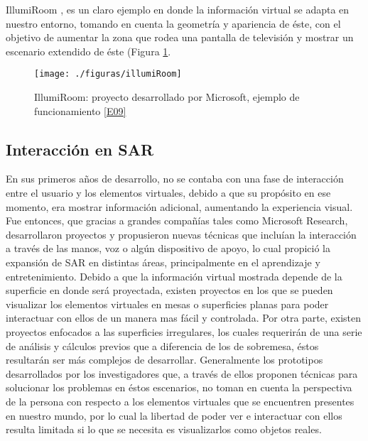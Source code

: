 \documentclass[a4paper,openright,12pt]{report}
\begin{document}
IllumiRoom \cite{jones2013}, es un claro ejemplo en donde la información virtual se adapta en nuestro entorno, tomando en cuenta la geometría y apariencia de éste, con el objetivo de aumentar la zona que rodea una pantalla de televisión y mostrar un escenario extendido de éste (Figura \ref{fig:illumiRoom}.
\begin{figure}[thb]
	\centering
	\texttt{[image: ./figuras/illumiRoom]}
	\caption[Proyecto IllumiRoom por Microsoft\textregistered]{IllumiRoom: proyecto desarrollado por Microsoft\textregistered, ejemplo de funcionamiento \hyperlink{e09}{[E09]} } \label{fig:illumiRoom}
\end{figure}
\subsection{Interacción en SAR}
En sus primeros años de desarrollo, no se contaba con una fase de interacción entre el usuario y los elementos virtuales, debido a que su propósito en ese momento, era mostrar información adicional, aumentando la experiencia visual. Fue entonces, que gracias a grandes compañías tales como Microsoft Research\textregistered, desarrollaron proyectos y propusieron nuevas técnicas que incluían la interacción a través de las manos, voz o algún dispositivo de apoyo, lo cual propició la expansión de SAR en distintas áreas, principalmente en el aprendizaje y entretenimiento. Debido a que la información virtual mostrada depende de la superficie en donde será proyectada, existen proyectos en los que se pueden visualizar los elementos virtuales en mesas o superficies planas para poder interactuar con ellos de un manera mas fácil y controlada. Por otra parte, existen proyectos enfocados a las superficies irregulares, los cuales requerirán de una serie de análisis y cálculos previos que a diferencia de los de sobremesa, éstos resultarán ser más complejos de desarrollar. Generalmente los prototipos desarrollados por los investigadores que, a través de ellos proponen técnicas para solucionar los problemas en éstos escenarios, no toman en cuenta la perspectiva de la persona con respecto a los elementos virtuales que se encuentren presentes en nuestro mundo, por lo cual la libertad de poder ver e interactuar con ellos resulta limitada si lo que se necesita es visualizarlos como objetos reales.\\
\end{document}

